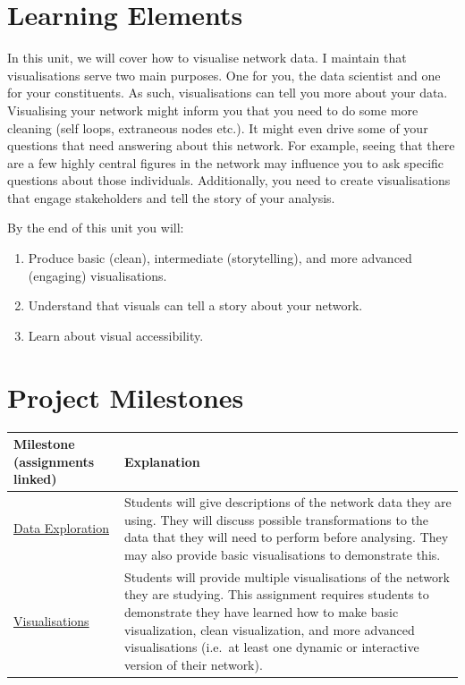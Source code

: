 \documentclass[
  letterpaper,
  DIV=11,
  numbers=noendperiod]{scrreprt}
\begin{document}
\section{Learning Elements}\label{learning-elements-1}

In this unit, we will cover how to visualise network data. I maintain
that visualisations serve two main purposes. One for you, the data
scientist and one for your constituents. As such, visualisations can
tell you more about your data. Visualising your network might inform you
that you need to do some more cleaning (self loops, extraneous nodes
etc.). It might even drive some of your questions that need answering
about this network. For example, seeing that there are a few highly
central figures in the network may influence you to ask specific
questions about those individuals. Additionally, you need to create
visualisations that engage stakeholders and tell the story of your
analysis.

By the end of this unit you will:

\begin{enumerate}
\def\labelenumi{\arabic{enumi}.}
\item
  Produce basic (clean), intermediate (storytelling), and more advanced
  (engaging) visualisations.
\item
  Understand that visuals can tell a story about your network.
\item
  Learn about visual accessibility.
\end{enumerate}

\section{Project Milestones}\label{project-milestones-1}

\begin{longtable}[]{@{}
  >{\raggedright\arraybackslash}p{}
  >{\raggedright\arraybackslash}p{}@{}}
\toprule\noalign{}
\begin{minipage}[b]{\linewidth}\raggedright
Milestone (assignments linked)
\end{minipage} & \begin{minipage}[b]{\linewidth}\raggedright
Explanation
\end{minipage} \\
\midrule\noalign{}
\endhead
\bottomrule\noalign{}
\endlastfoot
\href{A3_Data\%20Exploration.qmd}{Data Exploration} & Students will give
descriptions of the network data they are using. They will discuss
possible transformations to the data that they will need to perform
before analysing. They may also provide basic visualisations to
demonstrate this. \\
\href{A4_Visualisations.qmd}{Visualisations} & Students will provide
multiple visualisations of the network they are studying. This
assignment requires students to demonstrate they have learned how to
make basic visualization, clean visualization, and more advanced
visualisations (i.e.~at least one dynamic or interactive version of
their network). \\
\end{longtable}
\end{document}
